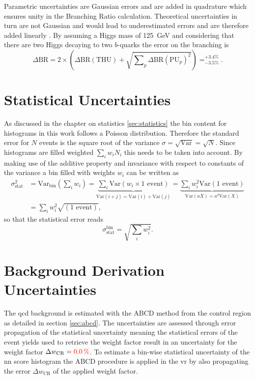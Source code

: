 Parametric uncertainties are Gaussian errors and are added in quadrature which ensures unity in the Branching Ratio calculation. Theoretical uncertainties in turn are not Gaussian and would lead to underestimated errors and are therefore added linearly \citep{de2016arxiv}. By assuming a Higgs mass of \qty[]{125}{GeV} and considering that there are two Higgs decaying to two $b$-quarks the error on the branching is 
\begin{equation}
\Delta\text{BR} = 2 \times \left(\Delta\text{BR}(\text{THU}) + \sqrt{\sum\nolimits_{p} \Delta\text{BR}(\text{PU}_{p})^2 }\right) = _{-3.5\%}^{+3.4\%}.
\end{equation}

\section{Statistical Uncertainties}
As discussed in the chapter on statistics \ref{sec:statistics} the bin content for histograms in this work follows a Poisson distribution. Therefore the standard error for $N$ events is the square root of the variance $\sigma=\sqrt{\text{Var}}=\sqrt{N}$. Since histograms are filled weighted $\sum_i w_i N_i$ this needs to be taken into account. By making use of the additive property and invariance with respect to constants of the variance a bin filled with weights $w_i$ can be written as
\begin{align} 
    \sigma_\text{stat}^2 &= \text{Var}_\text{bin}\left(\sum_i w_i\right)
    =
    \underbrace{\sum_i \text{Var}(w_i \times 1\text{ event})}_{\text{Var}(i+j)=\text{Var}(i)+\text{Var}(j)}
    =
    \underbrace{\sum_i w_i^2\text{Var}(1\text{ event})}_{\text{Var}(aX)=a^2\text{Var}(X)}\\ \nonumber
    &=\sum_i w_i^2\sqrt{(1\text{ event})},
\end{align}
so that the statistical error reads
\begin{equation}
    \sigma_\text{stat}^\text{bin}=\sqrt{\sum_i w_i^2}.
\end{equation}

\section{Background Derivation Uncertainties}
The \ac{qcd} background is estimated with the ABCD method from the control region as detailed in section \ref{sec:abcd}. The uncertainties are assessed through error propagation of the statistical uncertainty meaning the statistical errors of the event yields used to retrieve the weight factor result in an uncertainty for the weight factor $\Delta w_\text{CR}= \textcolor{red}{\qty[]{0.0}{\percent}}$. To estimate a bin-wise statistical uncertainty of the \ac{nn} score histogram the ABCD procedure is applied in the \ac{vr} by also propagating the error $\Delta w_\text{CR}$ of the applied weight factor. 